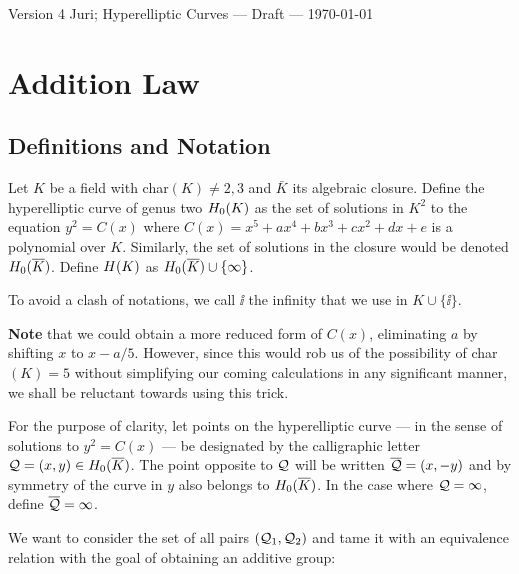 \documentclass[english,11pt,a4paper]{article}
\begin{document}

Version 4 \scriptsize \hfill Juri; Hyperelliptic Curves --- Draft --- \today
\normalsize

\section{Addition Law}

\subsection{Definitions and Notation}

\begin{defin}
	Let $K$ be a field with char$(K) \neq 2, 3$ and $\bar K$ its algebraic closure. Define the hyperelliptic curve of genus two $H_0(K)$ as the set of solutions in $K^2$ to the equation $y^2=C(x)$ where $C(x)=x^5+ax^4+bx^3+cx^2+dx+e$ is a polynomial over $K$. Similarly, the set of solutions in the closure would be denoted $H_0(\overline K)$.	Define $H(K)$ as $H_0(\overline K) \cup \{ \infty \}$.

	To avoid a clash of notations, we call $\ii$ the infinity that we use in $K \cup \{ \ii \}.$

	\textbf{Note} that we could obtain a more reduced form of $C(x)$, eliminating $a$ by shifting $x$ to $x-a/5$. However, since this would rob us of the possibility of char$(K) = 5$ without simplifying our coming calculations in any significant manner, we shall be reluctant towards using this trick.

	For the purpose of clarity, let points on the hyperelliptic curve --- in the sense of solutions to $y^2=C(x)$ --- be designated by the calligraphic letter $\mathcal{Q}=(x,y) \in H_0(\overline K)$. The point opposite to $\mathcal{Q}$ will be written $\overline {\mathcal{Q}} = (x,-y)$ and by symmetry of the curve in $y$ also belongs to $H_0(\overline K)$. In the case where $\mathcal{Q} = \infty$, define $\overline {\mathcal{Q}} = \infty$. %

	We want to consider the set of all pairs $(\mathcal{Q}_1,\mathcal{Q}_2)$ and tame it with an equivalence relation with the goal of obtaining an additive group:
\end{defin}
\end{document}
